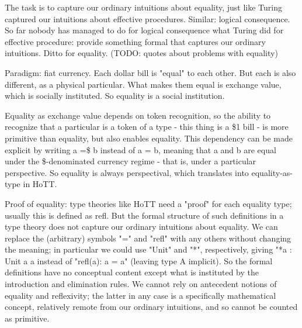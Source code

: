 \documentclass{article}
\begin{document}
\large


The task is to capture our ordinary intuitions about equality, just
like Turing captured our intuitions about effective procedures.
Similar: logical consequence.  So far nobody has managed to do for
logical consequence what Turing did for effective procedure: provide
something formal that captures our ordinary intuitions.  Ditto for
equality.  (TODO: quotes about problems with equality)

Paradigm: fiat currency.  Each dollar bill is "equal" to each other.
But each is also different, as a physical particular.  What makes them
equal is exchange value, which is socially instituted.  So equality is
a social institution.

Equality as exchange value depends on token recognition, so the
ability to recognize that a particular is a token of a type - this
thing is a \$1 bill - is more primitive than equality, but also enables
equality.  This dependency can be made explicit by writing a =\$ b
instead of a = b, meaning that a and b are equal under the
\$-denominated currency regime - that is, under a particular
perspective.  So equality is always perspectival, which translates
into equality-as-type in HoTT.

Proof of equality: type theories like HoTT need a "proof" for each
equality type; usually this is defined as refl.  But the formal
structure of such definitions in a type theory does not capture our
ordinary intuitions about equality.  We can replace the (arbitrary)
symbols "=" and "refl" with any others without changing the meaning;
in particular we could use "Unit" and "*", respectively, giving "*a :
Unit a a instead of "refl(a): a = a" (leaving type A implicit).  So
the formal definitions have no conceptual content except what is
instituted by the introduction and elimination rules.  We cannot rely
on antecedent notions of equality and reflexivity; the latter in any
case is a specifically mathematical concept, relatively remote from
our ordinary intuitions, and so cannot be counted as primitive.
\end{document}

